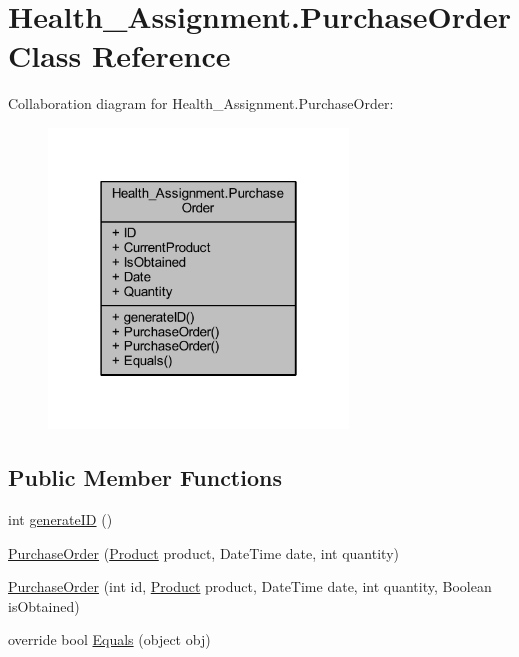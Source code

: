 \hypertarget{class_health___assignment_1_1_purchase_order}{}\section{Health\+\_\+\+Assignment.\+Purchase\+Order Class Reference}
\label{class_health___assignment_1_1_purchase_order}


Collaboration diagram for Health\+\_\+\+Assignment.\+Purchase\+Order\+:\nopagebreak
\begin{figure}[H]
\begin{center}
\leavevmode
\includegraphics[width=226pt]{class_health___assignment_1_1_purchase_order__coll__graph}
\end{center}
\end{figure}
\subsection*{Public Member Functions}
\begin{DoxyCompactItemize}
\item 
int \hyperlink{class_health___assignment_1_1_purchase_order_a806f820f1e7ec4cd404b7b58b3b087ed}{generate\+ID} ()
\item 
\hyperlink{class_health___assignment_1_1_purchase_order_a3c7ee17948ca9538d4082cdfc0afc7ba}{Purchase\+Order} (\hyperlink{class_health___assignment_1_1_product}{Product} product, Date\+Time date, int quantity)
\item 
\hyperlink{class_health___assignment_1_1_purchase_order_a9df7fbc6a9eebcfb0af622d0de191ece}{Purchase\+Order} (int id, \hyperlink{class_health___assignment_1_1_product}{Product} product, Date\+Time date, int quantity, Boolean is\+Obtained)
\item 
override bool \hyperlink{class_health___assignment_1_1_purchase_order_a2244ab7c6585fde385eda4fdc1ca2396}{Equals} (object obj)
\end{DoxyCompactItemize}
